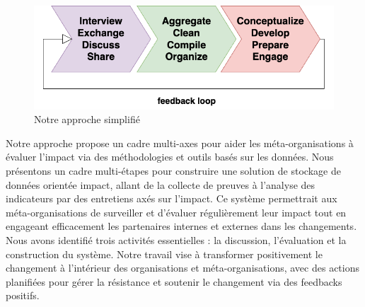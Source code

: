 \begin{figure}
    \centering
    \includegraphics[width=0.75\linewidth]{images/Diagrams-Simplified framework chain Our approach.png}
    \caption{Notre approche simplifié}
    \label{fig:simplified-approach}
\end{figure}
Notre approche propose un cadre multi-axes pour aider les méta-organisations à évaluer l'impact via des méthodologies et outils basés sur les données. Nous présentons un cadre multi-étapes pour construire une solution de stockage de données orientée impact, allant de la collecte de preuves à l'analyse des indicateurs par des entretiens axés sur l'impact. Ce système permettrait aux méta-organisations de surveiller et d'évaluer régulièrement leur impact tout en engageant efficacement les partenaires internes et externes dans les changements. Nous avons identifié trois activités essentielles : la discussion, l'évaluation et la construction du système. Notre travail vise à transformer positivement le changement à l'intérieur des organisations et méta-organisations, avec des actions planifiées pour gérer la résistance et soutenir le changement via des feedbacks positifs. 